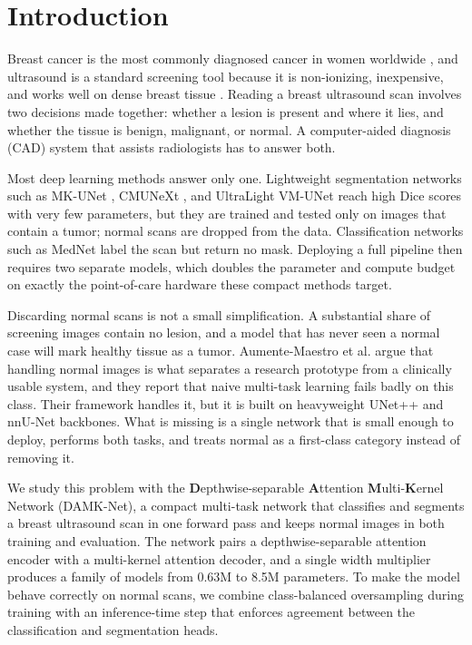 \documentclass[runningheads]{llncs}
\begin{document}
\section{Introduction}
Breast cancer is the most commonly diagnosed cancer in women worldwide
\cite{Globocan}, and ultrasound is a standard screening tool because it is
non-ionizing, inexpensive, and works well on dense breast tissue
\cite{BUSI,Survey}. Reading a breast ultrasound scan involves two decisions made
together: whether a lesion is present and where it lies, and whether the tissue
is benign, malignant, or normal. A computer-aided diagnosis (CAD) system that
assists radiologists has to answer both.

Most deep learning methods answer only one. Lightweight segmentation networks
such as MK-UNet \cite{MKUNet}, CMUNeXt \cite{CMUNeXt}, and UltraLight VM-UNet
\cite{VMUNet} reach high Dice scores with very few parameters, but they are
trained and tested only on images that contain a tumor; normal scans are dropped
from the data. Classification networks such as MedNet \cite{MedNet} label the
scan but return no mask. Deploying a full pipeline then requires two separate
models, which doubles the parameter and compute budget on exactly the
point-of-care hardware these compact methods target.

Discarding normal scans is not a small simplification. A substantial share of
screening images contain no lesion, and a model that has never seen a normal
case will mark healthy tissue as a tumor. Aumente-Maestro et al. \cite{CMPB}
argue that handling normal images is what separates a research prototype from a
clinically usable system, and they report that naive multi-task learning fails
badly on this class. Their framework handles it, but it is built on heavyweight
UNet++ and nnU-Net backbones. What is missing is a single network that is small
enough to deploy, performs both tasks, and treats normal as a first-class
category instead of removing it.

We study this problem with the \textbf{D}epthwise-separable \textbf{A}ttention
\textbf{M}ulti-\textbf{K}ernel Network (DAMK-Net), a compact multi-task network
that classifies and segments a breast ultrasound scan in one forward pass and
keeps normal images in both training and evaluation. The network pairs a depthwise-separable
attention encoder with a multi-kernel attention decoder, and a single width
multiplier produces a family of models from 0.63M to 8.5M parameters. To make the
model behave correctly on normal scans, we combine class-balanced oversampling
during training with an inference-time step that enforces agreement between the
classification and segmentation heads.
\end{document}
